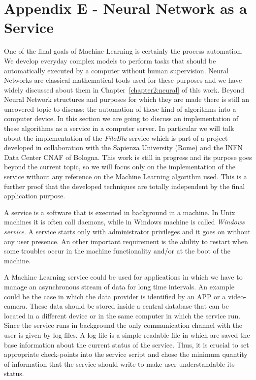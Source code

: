 \documentclass{standalone}
\begin{document}
\chapter*{Appendix E - Neural Network as a Service}

One of the final goals of Machine Learning is certainly the process automation.
We develop everyday complex models to perform tasks that should be automatically executed by a computer without human supervision.
Neural Networks are classical mathematical tools used for these purposes and we have widely discussed about them in Chapter~\ref{chapter2:neural} of this work.
Beyond Neural Network structures and purposes for which they are made there is still an uncovered topic to discuss: the automation of these kind of algorithms into a computer device.
In this section we are going to discuss an implementation of these algorithms as a service in a computer server.
In particular we will talk about the implementation of the \emph{FiloBlu} service which is part of a project developed in collaboration with the Sapienza University (Rome) and the INFN Data Center CNAF of Bologna.
This work is still in progress and its purpose goes beyond the current topic, so we will focus only on the implementation of the service without any reference on the Machine Learning algorithm used.
This is a further proof that the developed techniques are totally independent by the final application purpose.

A service is a software that is executed in background in a machine.
In Unix machines it is often call \textsf{daemon}s, while in Windows machine is called \emph{Windows service}.
A service starts only with administrator privileges and it goes on without any user presence.
An other important requirement is the ability to restart when some troubles occur in the machine functionality and/or at the boot of the machine.

A Machine Learning service could be used for applications in which we have to manage an asynchronous stream of data for long time intervals.
An example could be the case in which the data provider is identified by an APP or a video-camera.
These data should be stored inside a central database that can be located in a different device or in the same computer in which the service run.
Since the service runs in background the only communication channel with the user is given by log files.
A log file is a simple readable file in which are saved the base information about the current status of the service.
Thus, it is crucial to set appropriate check-points into the service script and chose the minimum quantity of information that the service should write to make user-understandable its status.
\end{document}
